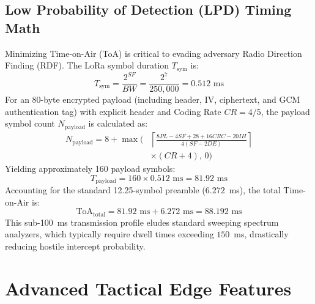 \documentclass[conference]{IEEEtran}
\begin{document}
\subsection{Low Probability of Detection (LPD) Timing Math}
Minimizing Time-on-Air (ToA) is critical to evading adversary Radio Direction Finding (RDF). The LoRa symbol duration $T_{\text{sym}}$ is:
\begin{equation}
T_{\text{sym}} = \frac{2^{SF}}{BW} = \frac{2^7}{250,000} = 0.512\text{ ms}
\label{eq:tsym}
\end{equation}
For an 80-byte encrypted payload (including header, IV, ciphertext, and GCM authentication tag) with explicit header and Coding Rate $CR = 4/5$, the payload symbol count $N_{\text{payload}}$ is calculated as:
\begin{equation}
\begin{split}
N_{\text{payload}} = 8 + \max\Bigg(&\left\lceil \frac{8PL - 4SF + 28 + 16CRC - 20IH}{4(SF - 2DE)} \right\rceil \\
&\times (CR + 4),\, 0\Bigg)
\end{split}
\end{equation}
Yielding approximately 160 payload symbols:
\begin{equation}
T_{\text{payload}} = 160 \times 0.512\text{ ms} = 81.92\text{ ms}
\end{equation}
Accounting for the standard 12.25-symbol preamble ($6.272$~ms), the total Time-on-Air is:
\begin{equation}
\text{ToA}_{\text{total}} = 81.92\text{ ms} + 6.272\text{ ms} = 88.192\text{ ms}
\end{equation}
This sub-100~ms transmission profile eludes standard sweeping spectrum analyzers, which typically require dwell times exceeding $150$~ms, drastically reducing hostile intercept probability.

\section{Advanced Tactical Edge Features}
\end{document}
